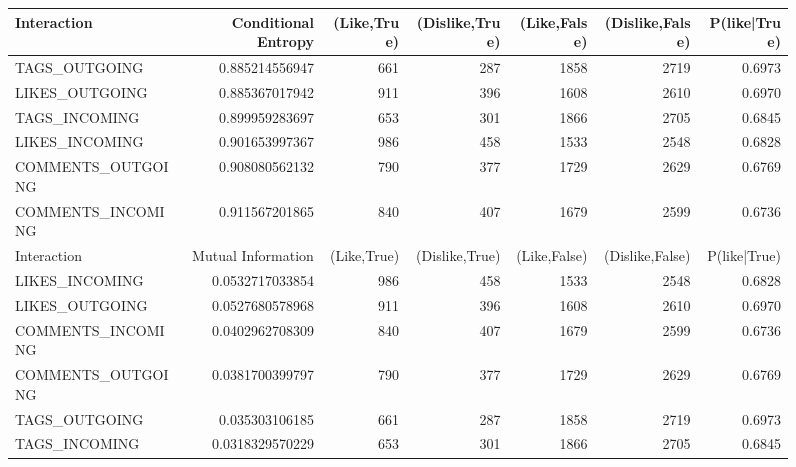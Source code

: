 \documentclass[letterpaper]{article}
\begin{document}
\begin{figure}
	
\cleardoublepage
\begin{table}
	\centering
	\begin{tabular}{| >{\small}l | >{\small}r | >{\small}r | >{\small}r | >{\small}r | >{\small}r | >{\small}r |}
		\hline
		Interaction & Conditional Entropy & (Like,True) & (Dislike,True) & (Like,False) & (Dislike,False)  & P(like|True)\\
		\hline
		TAGS\_OUTGOING & 0.885214556947 & 661 & 287 & 1858 & 2719  & 0.6973\\
		LIKES\_OUTGOING & 0.885367017942 & 911 & 396 & 1608 & 2610 & 0.6970\\
		TAGS\_INCOMING & 0.899959283697 & 653 & 301 & 1866 & 2705 & 0.6845\\
		LIKES\_INCOMING & 0.901653997367 & 986 & 458 & 1533 & 2548 & 0.6828\\
		COMMENTS\_OUTGOING & 0.908080562132 & 790 & 377 & 1729 & 2629 & 0.6769\\
		COMMENTS\_INCOMING & 0.911567201865 & 840 & 407 & 1679 & 2599 & 0.6736\\
		\hline
		\hline
		Interaction & Mutual Information & (Like,True) & (Dislike,True) & (Like,False) & (Dislike,False)& P(like|True)\\		
		\hline
		LIKES\_INCOMING & 0.0532717033854 & 986 & 458 & 1533 & 2548 &  0.6828\\
		LIKES\_OUTGOING & 0.0527680578968 & 911 & 396 & 1608 & 2610 & 0.6970\\
		COMMENTS\_INCOMING & 0.0402962708309 & 840 & 407 & 1679 & 2599 & 0.6736\\
		COMMENTS\_OUTGOING & 0.0381700399797 & 790 & 377 & 1729 & 2629 & 0.6769\\
		TAGS\_OUTGOING & 0.035303106185 & 661 & 287 & 1858 & 2719 & 0.6973\\
		TAGS\_INCOMING & 0.0318329570229 & 653 & 301 & 1866 & 2705 & 0.6845\\
		\hline
		

\end{tabular}
\end{table}
\end{figure}
\end{document}
